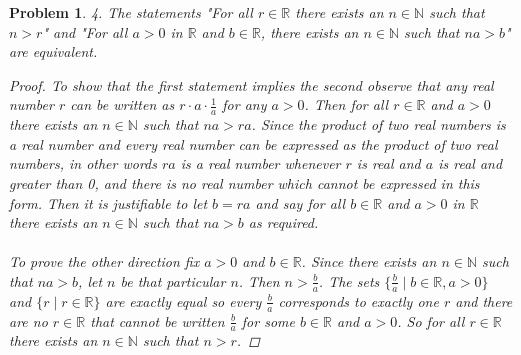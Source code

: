 \documentclass{article}
\newtheorem*{Problem}{Problem}
\begin{document}
\begin{Problem}
    4. The statements "For all $r\in \mathbb{R}$ there exists an $n\in \mathbb{N}$ such that $n>r$" and "For all $a>0$ in $\mathbb{R}$ and $b \in \mathbb{R}$, there exists an $n\in \mathbb{N}$ such that $na>b$" are equivalent.
    \begin{proof}
    To show that the first statement implies the second observe that any real number $r$ can be written as $r\cdot a\cdot \frac{1}{a}$ for any $a>0$.  Then for all $r\in \mathbb{R}$ and $a>0$ there exists an $n\in \mathbb{N}$ such that $na>ra$.  Since the product of two real numbers is a real number and every real number can be expressed as the product of two real numbers, in other words $ra$ is a real number whenever $r$ is real and $a$ is real and greater than 0, and there is no real number which cannot be expressed in this form.  Then it is justifiable to let $b=ra$ and say for all $b\in \mathbb{R}$ and $a>0$ in $\mathbb{R}$ there exists an $n\in \mathbb{N}$ such that $na>b$ as required. \\ \\
    To prove the other direction fix $a>0$ and $b\in \mathbb{R}$.  Since there exists an $n\in \mathbb{N}$ such that $na>b$, let $n$ be that particular $n$.  Then $n>\frac{b}{a}$.  The sets $\{\frac{b}{a}\mid b\in \mathbb{R},a>0\}$ and $\{r\mid r\in \mathbb{R}\}$ are exactly equal so every $\frac{b}{a}$ corresponds to exactly one $r$ and there are no $r\in \mathbb{R}$ that cannot be written $\frac{b}{a}$ for some $b\in \mathbb{R}$ and $a>0$.  So for all $r\in \mathbb{R}$ there exists an $n\in \mathbb{N}$ such that $n>r$.
    \end{proof}
\end{Problem}
\end{document}
